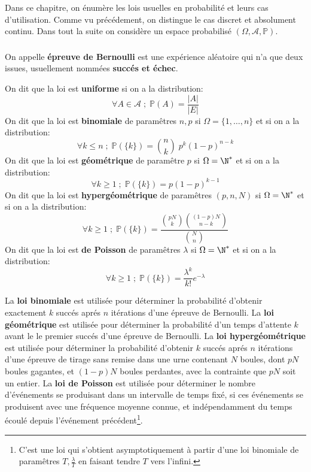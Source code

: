 \chapter*{} %
Dans ce chapitre, on énumère les lois usuelles en probabilité et leurs cas d'utilisation. Comme vu précédement, on distingue le cas discret et absolument continu. Dans tout la suite on considère un espace probabilisé \( ( \Omega, \mathscr{A}, \mathbb{P}) \).

\subsection*{}
On appelle \textbf{épreuve de Bernoulli} est une expérience aléatoire qui n'a que deux issues, usuellement nommées \textbf{succés et échec}.\<

On dit que la loi est \textbf{uniforme} si on a la distribution:
\[
   \forall A \in \mathscr{A} \; ; \; \mathbb{P}(A) = \frac{|A|}{|E|}  
\]
On dit que la loi est \textbf{binomiale} de paramêtres \(n, p\) si \( \Omega = \{1, \ldots, n\}\) et si on a la distribution:
\[
   \forall k \leq n \; ; \; \mathbb{P}(\{k\}) = \binom{n}{k} \; p^k(1-p)^{n-k}
\]
On dit que la loi est \textbf{géométrique} de paramêtre \( p \) si \(\Omega = \N^*\) et si on a la distribution:
\[
   \forall k \geq 1 \; ; \;  \mathbb{P}(\{k\}) = p(1 - p)^{k - 1}
\]
On dit que la loi est \textbf{hypergéométrique} de paramêtres \((p, n, N)\) si \(\Omega = \N^*\) et si on a la distribution:
\[
   \forall k \geq 1 \; ; \; \mathbb{P}(\{k\}) = \frac{\binom{pN}{k}\binom{(1-p)N}{n - k}}{\binom{N}{n}}
\]
On dit que la loi est \textbf{de Poisson} de paramêtres \( \lambda\) si \(\Omega = \N^*\) et si on a la distribution:
\[
   \forall k \geq 1 \; ; \; \mathbb{P}(\{k\}) = \frac{\lambda^k}{k!}e^{-\lambda}
\]\<

La \textbf{loi binomiale} est utilisée pour déterminer la probabilité d'obtenir exactement \(k\) succés aprés \(n\) itérations d'une épreuve de Bernoulli. \+
La \textbf{loi géométrique} est utilisée pour déterminer la probabilité d'un temps d'attente \( k \) avant le le premier succés d'une épreuve de Bernoulli.\+
La \textbf{loi hypergéométrique} est utilisée pour déterminer la probabilité d'obtenir \(k\) succés aprés \(n\) itérations d'une épreuve de tirage sans remise dans une urne contenant \(N\) boules, dont \(pN\) boules gagantes, et \((1-p)N\) boules perdantes, avec la contrainte que \(pN\) soit un entier.\+
La \textbf{loi de Poisson} est utilisée pour déterminer le nombre d'événements se produisant dans un intervalle de temps fixé, si ces événements se produisent avec une fréquence moyenne connue, et indépendamment du temps écoulé depuis l'événement précédent\footnote[1]{C'est une loi qui s'obtient asymptotiquement à partir d'une loi binomiale de paramêtres \(T, \frac{\lambda}{T}\) en faisant tendre \(T\) vers l'infini.}.

